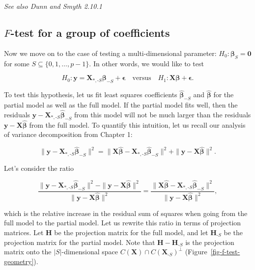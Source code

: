 \documentclass[
  11pt,
  letterpaper,
  oneside]{book}
\theoremstyle{definition}
\theoremstyle{plain}
\theoremstyle{plain}
\theoremstyle{plain}
\theoremstyle{remark}
\begin{document}
\emph{See also Dunn and Smyth 2.10.1}

\hypertarget{f-test-for-a-group-of-coefficients}{%
\subsection{\texorpdfstring{\(F\)-test for a group of
coefficients}{F-test for a group of coefficients}}\label{f-test-for-a-group-of-coefficients}}

Now we move on to the case of testing a multi-dimensional parameter:
\(H_0: \boldsymbol{\beta}_S = \boldsymbol{0}\) for some
\(S \subseteq \{0, 1, \dots, p-1\}\). In other words, we would like to
test

\[
H_0: \boldsymbol{y} = \boldsymbol{X}_{*, \text{-}S} \boldsymbol{\beta}_{-S} + \boldsymbol{\epsilon} \quad \text{versus} \quad H_1: \boldsymbol{X} \boldsymbol{\beta} + \boldsymbol{\epsilon}.
\]

To test this hypothesis, let us fit least squares coefficients
\(\boldsymbol{\widehat{\beta}}_{-S}\) and
\(\boldsymbol{\widehat{\beta}}\) for the partial model as well as the
full model. If the partial model fits well, then the residuals
\(\boldsymbol{y} - \boldsymbol{X}_{*, \text{-}S} \boldsymbol{\widehat{\beta}}_{-S}\)
from this model will not be much larger than the residuals
\(\boldsymbol{y} - \boldsymbol{X} \boldsymbol{\widehat{\beta}}\) from
the full model. To quantify this intuition, let us recall our analysis
of variance decomposition from Chapter 1:

\[
\|\boldsymbol{y} - \boldsymbol{X}_{*, \text{-}S} \boldsymbol{\widehat{\beta}}_{-S}\|^2 = \|\boldsymbol{X} \boldsymbol{\widehat{\beta}} - \boldsymbol{X}_{*, \text{-}S} \boldsymbol{\widehat{\beta}}_{-S}\|^2 + \|\boldsymbol{y} - \boldsymbol{X} \boldsymbol{\widehat{\beta}}\|^2.
\]

Let's consider the ratio

\[
\frac{\|\boldsymbol{y} - \boldsymbol{X}_{*, \text{-}S} \boldsymbol{\widehat{\beta}}_{-S}\|^2 - \|\boldsymbol{y} - \boldsymbol{X} \boldsymbol{\widehat{\beta}}\|^2}{\|\boldsymbol{y} - \boldsymbol{X} \boldsymbol{\widehat{\beta}}\|^2} = \frac{\|\boldsymbol{X} \boldsymbol{\widehat{\beta}} - \boldsymbol{X}_{*, \text{-}S} \boldsymbol{\widehat{\beta}}_{-S}\|^2}{\|\boldsymbol{y} - \boldsymbol{X} \boldsymbol{\widehat{\beta}}\|^2},
\]

which is the relative increase in the residual sum of squares when going
from the full model to the partial model. Let us rewrite this ratio in
terms of projection matrices. Let \(\boldsymbol{H}\) be the projection
matrix for the full model, and let \(\boldsymbol{H}_{\text{-}S}\) be the
projection matrix for the partial model. Note that
\(\boldsymbol{H} - \boldsymbol{H}_{\text{-}S}\) is the projection matrix
onto the \(|S|\)-dimensional space
\(C(\boldsymbol{X}) \cap C(\boldsymbol{X}_{\text{-}S})^\perp\)
(Figure~\ref{fig-f-test-geometry}).
\end{document}
